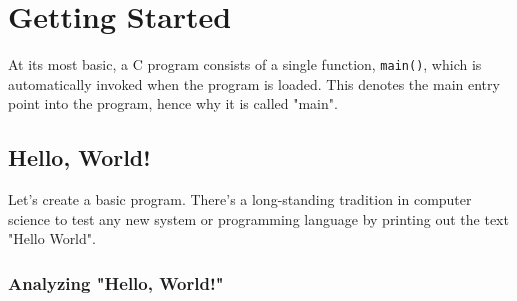 \documentclass[../main.tex]{subfiles}
\begin{document}
\chapter{Getting Started}
At its most basic, a C program consists of a single function, \lstinline{main()},
which is automatically invoked when the program is loaded. This denotes the main
entry point into the program, hence why it is called "main".

\section{Hello, World!}


Let's create a basic program. There's a long-standing tradition in computer science to
test any new system or programming language by printing out the text "Hello World".





\subsection{Analyzing "Hello, World!"}
\end{document}
